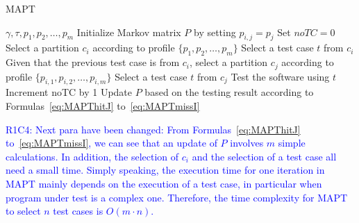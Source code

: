 \documentclass[10pt,journal,compsoc]{IEEEtran}
\begin{document}
\begin{algorithm}
	\caption{MAPT}
	\label{alg:MAPT}
	\begin{algorithmic}[1]
		\renewcommand{\algorithmicrequire}{\textbf{Input:}}
		\renewcommand{\algorithmicensure}{\textbf{Output:}}
		\renewcommand{\algorithmicendwhile}{\algorithmicend\_\algorithmicwhile}
		\renewcommand{\algorithmicendfor}{\algorithmicend\_\algorithmicfor}
		\renewcommand{\algorithmicendif}{\algorithmicend\_\algorithmicif}
		\renewcommand{\algorithmicthen}{}
		\renewcommand{\algorithmicdo}{}
		\REQUIRE $\gamma, \tau, p_1, p_2, \ldots, p_m$
		\STATE Initialize Markov matrix $P$ by setting $p_{i,j} = p_j$
		\STATE Set $noTC = 0$
		\STATE Select a partition $c_i$ according to profile $\{p_1, p_2, \ldots, p_m\}$
		\STATE Select a test case $t$ from $c_i$
		\ELSE
		\STATE Given that the previous test case is from $c_i$, select a partition $c_j$ according to profile $\{p_{i,1}, p_{i,2}, \ldots, p_{i,m}\}$
		\STATE Select a test case $t$ from $c_j$
		\ENDIF
		\STATE Test the software using $t$
		\STATE Increment noTC by 1
		\STATE Update $P$ based on the testing result according to Formulas~\ref{eq:MAPThitJ} to~\ref{eq:MAPTmissI}
		\ENDWHILE
	\end{algorithmic}
\end{algorithm}

\textcolor{blue}{R1C4: Next para have been changed:
From Formulas~\ref{eq:MAPThitJ} to~\ref{eq:MAPTmissI}, we can see that an update of $P$ involves $m$ simple calculations. In addition, the selection of $c_i$ and the selection of a test case all need a small time. Simply speaking, the execution time for one iteration in MAPT mainly depends on the execution of a test case, in particular when program under test is a complex one. Therefore, the time complexity for MAPT to select $n$ test cases is $O(m \cdot n)$. }

\end{document}
